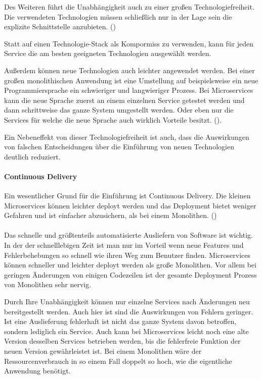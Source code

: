 Des Weiteren führt die Unabhängigkeit auch zu einer großen Technologiefreiheit. Die verwendeten Technologien müssen schließlich nur in der Lage sein die explizite Schnittstelle anzubieten. (\cite[S. 5]{wolffMicroservices2018})

Statt auf einen Technologie-Stack als Kompormiss zu verwenden, kann für jeden Service die am besten geeigneten Technologien ausgewählt werden. 

Außerdem können neue Technologien auch leichter angewendet werden. Bei einer großen monolithischen Anwendung ist eine Umstellung auf beispielsweise ein neue Programmiersprache ein schwieriger und langwieriger Prozess. Bei Microservices kann die neue Sprache zuerst an einem einzelnen Service getestet werden und dann schrittweise das ganze System umgestellt werden. Oder eben nur die Services für welche die neue Sprache auch wirklich Vorteile besitzt. (\cite[S. 25]{newmanMicroservices2015}).

Ein Nebeneffekt von dieser Technologiefreiheit ist auch, dass die Auswirkungen von falschen Entscheidungen über die Einführung von neuen Technologien deutlich reduziert. 


\paragraph{Continuous Delivery}

Ein wesentlicher Grund für die Einführung ist Continuous Delivery. Die kleinen Microservices können leichter deployt werden und das Deployment bietet weniger Gefahren und ist einfacher abzusichern, als bei einem Monolithen. (\cite[S. 5]{wolffMicroservices2018}) \\
\\
Das schnelle und größtenteils automatisierte Ausliefern von Software ist wichtig. In der der schnelllebigen Zeit ist man nur im Vorteil wenn neue Features und Fehlerbehebungen so schnell wie ihren Weg zum Benutzer finden. Microservices können schneller und leichter deployt werden als große Monolithen. Vor allem bei geringen Änderungen von einigen Codezeilen ist der gesamte Deployment Prozess von Monolithen sehr nervig.

Durch Ihre Unabhängigkeit können nur einzelne Services nach Änderungen neu bereitgestellt werden. Auch hier ist sind die Auswirkungen von Fehlern geringer. Ist eine Auslieferung fehlerhaft ist nicht das ganze System davon betroffen, sondern lediglich ein Service. Auch kann bei Microservices leicht noch eine alte Version desselben Services betrieben werden, bis die fehlerfreie Funktion der neuen Version gewährleistet ist. Bei einem Monolithen wäre der Ressourcenverbrauch in so einem Fall doppelt so hoch, wie die eigentliche Anwendung benötigt. \\

